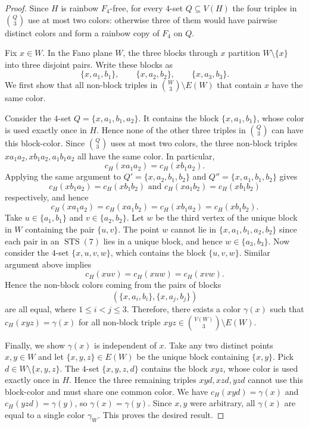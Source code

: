 \documentclass[10pt,a4paper]{article}
\theoremstyle{definition}
\DeclareMathOperator{\STS}{STS}
\begin{document}
\begin{proof}
    Since $H$ is rainbow $F_4$-free, for every $4$-set $Q\subseteq V(H)$ the four triples in $\binom{Q}{3}$ use at most two colors: otherwise three of them would have pairwise distinct colors and form a rainbow copy of $F_4$ on $Q$.

    Fix $x\in W$.
    In the Fano plane $W$, the three blocks through $x$ partition $W\setminus\{x\}$ into three disjoint pairs.
    Write these blocks as
    \[
        \{x,a_1,b_1\},\qquad \{x,a_2,b_2\},\qquad \{x,a_3,b_3\}.
    \]
    We first show that all non-block triples in $\binom{W}{3}\setminus E(W)$ that contain $x$ have the same color.

    Consider the $4$-set $Q=\{x,a_1,b_1,a_2\}$.
    It contains the block $\{x,a_1,b_1\}$, whose color is used exactly once in $H$.
    Hence none of the other three triples in $\binom{Q}{3}$ can have this block-color.
    Since $\binom{Q}{3}$ uses at most two colors, the three non-block triples $xa_1a_2,xb_1a_2,a_1b_1a_2$ all have the same color.
    In particular,
    \begin{equation}\label{eq:fano_cross_1}
        c_H(xa_1a_2)=c_H(xb_1a_2).
    \end{equation}
    Applying the same argument to $Q'=\{x,a_2,b_1,b_2\}$ and $Q''=\{x,a_1,b_1,b_2\}$ gives
    \begin{equation}\label{eq:fano_cross_2}
        c_H(xb_1a_2)=c_H(xb_1b_2) \text{ and }c_H(xa_1b_2)=c_H(xb_1b_2)
    \end{equation}
    respectively, and hence
    \[
        c_H(xa_1a_2)=c_H(xa_1b_2)=c_H(xb_1a_2)=c_H(xb_1b_2).
    \]
    Take $u\in\{a_1,b_1\}$ and $v\in\{a_2,b_2\}$.
    Let $w$ be the third vertex of the unique block in $W$ containing the pair $\{u,v\}$.
    The point $w$ cannot lie in $\{x,a_1,b_1,a_2,b_2\}$ since each pair in an $\STS(7)$ lies in a unique block, and hence $w\in\{a_3,b_3\}$.
    Now consider the $4$-set $\{x,u,v,w\}$, which contains the block $\{u,v,w\}$.
    Similar argument above implies
    \[
        c_H(xuv)=c_H(xuw)=c_H(xvw).
    \]
    Hence the non-block colors coming from the pairs of blocks
    \[
        (\{x,a_i,b_i\},\{x,a_j,b_j\})
    \]
    are all equal, where $1\le i<j\le3$.
    Therefore, there exists a color $\gamma(x)$ such that $c_H(xyz)=\gamma(x)$ for all non-block triple $xyz\in \binom{V(W)}{3}\setminus E(W)$.

    Finally, we show $\gamma(x)$ is independent of $x$.
    Take any two distinct points $x,y\in W$ and let $\{x,y,z\}\in E(W)$ be the unique block containing $\{x,y\}$.
    Pick $d\in W\setminus\{x,y,z\}$.
    The $4$-set $\{x,y,z,d\}$ contains the block $xyz$, whose color is used exactly once in $H$.
    Hence the three remaining triples $xyd,xzd,yzd$ cannot use this block-color and must share one common color.
    We have $c_H(xyd)=\gamma(x)$ and $c_H(yzd)=\gamma(y)$, so $\gamma(x)=\gamma(y)$.
    Since $x,y$ were arbitrary, all $\gamma(x)$ are equal to a single color $\gamma_W$.
    This proves the desired result.
\end{proof}
\end{document}
